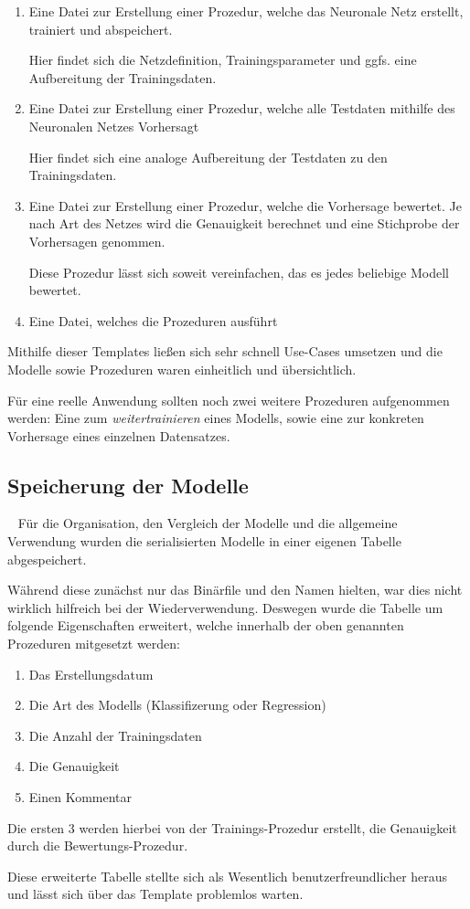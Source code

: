 \begin{enumerate}
	\item Eine Datei zur Erstellung einer Prozedur, welche das Neuronale Netz erstellt, trainiert und abspeichert.
	
	Hier findet sich die Netzdefinition, Trainingsparameter und ggfs. eine Aufbereitung der Trainingsdaten.
	\item Eine Datei zur Erstellung einer Prozedur, welche alle Testdaten mithilfe des Neuronalen Netzes Vorhersagt
	
	Hier findet sich eine analoge Aufbereitung der Testdaten zu den Trainingsdaten.
	\item Eine Datei zur Erstellung einer Prozedur, welche die Vorhersage bewertet. Je nach Art des Netzes wird die Genauigkeit berechnet und eine Stichprobe der Vorhersagen genommen.
	
	Diese Prozedur lässt sich soweit vereinfachen, das es jedes beliebige Modell bewertet.
	\item Eine Datei, welches die Prozeduren ausführt
\end{enumerate}

Mithilfe dieser Templates ließen sich sehr schnell Use-Cases umsetzen und die Modelle sowie Prozeduren waren einheitlich und übersichtlich. 

Für eine reelle Anwendung sollten noch zwei weitere Prozeduren aufgenommen werden: Eine zum \textit{weitertrainieren} eines Modells, sowie eine zur konkreten Vorhersage eines einzelnen Datensatzes. 

\subsection{Speicherung der Modelle} ~\newline
Für die Organisation, den Vergleich der Modelle und die allgemeine Verwendung wurden die serialisierten Modelle in einer eigenen Tabelle abgespeichert. 

Während diese zunächst nur das Binärfile und den Namen hielten, war dies nicht wirklich hilfreich bei der Wiederverwendung. Deswegen wurde die Tabelle um folgende Eigenschaften erweitert, welche innerhalb der oben genannten Prozeduren mitgesetzt werden:

\begin{enumerate}
	\item Das Erstellungsdatum
	\item Die Art des Modells (Klassifizerung oder Regression)
	\item Die Anzahl der Trainingsdaten
	\item Die Genauigkeit
	\item Einen Kommentar
\end{enumerate}

Die ersten 3 werden hierbei von der Trainings-Prozedur erstellt, die Genauigkeit durch die Bewertungs-Prozedur.

Diese erweiterte Tabelle stellte sich als Wesentlich benutzerfreundlicher heraus und lässt sich über das Template problemlos warten. 